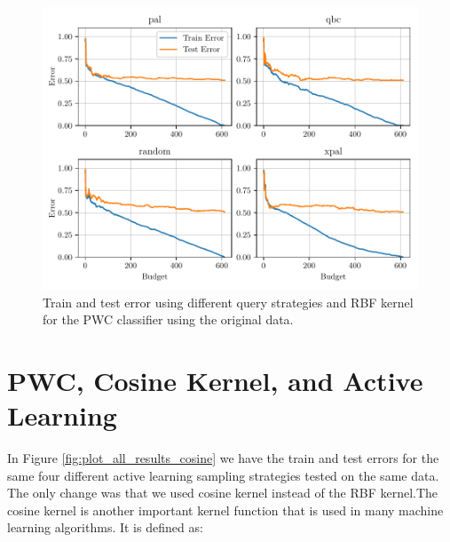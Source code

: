 \begin{figure}[ht]
  \centering
  \includegraphics[width=\textwidth]{../img/plot_all_results_rbf_original_data}
  \caption{Train and test error using different query strategies and RBF kernel for the PWC classifier using the original data.}
  \label{fig:plot_all_results_rbf}
\end{figure}


\section{PWC, Cosine Kernel, and Active Learning}

In Figure \ref{fig:plot_all_results_cosine} we have the train and test errors for the same four different active learning sampling strategies tested on the same data. The only change was that we used cosine kernel instead of the RBF kernel.The cosine kernel is another important kernel function that is used in many machine learning algorithms. It is defined as:

